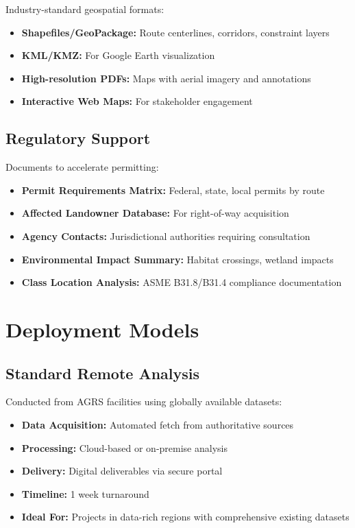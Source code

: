 \documentclass[11pt,letterpaper]{article}
\begin{document}
Industry-standard geospatial formats:

\begin{itemize}[leftmargin=*]
    \item \textbf{Shapefiles/GeoPackage:} Route centerlines, corridors, constraint layers
    \item \textbf{KML/KMZ:} For Google Earth visualization
    \item \textbf{High-resolution PDFs:} Maps with aerial imagery and annotations
    \item \textbf{Interactive Web Maps:} For stakeholder engagement
\end{itemize}

\subsection{Regulatory Support}

Documents to accelerate permitting:

\begin{itemize}[leftmargin=*]
    \item \textbf{Permit Requirements Matrix:} Federal, state, local permits by route
    \item \textbf{Affected Landowner Database:} For right-of-way acquisition
    \item \textbf{Agency Contacts:} Jurisdictional authorities requiring consultation
    \item \textbf{Environmental Impact Summary:} Habitat crossings, wetland impacts
    \item \textbf{Class Location Analysis:} ASME B31.8/B31.4 compliance documentation
\end{itemize}

\newpage

\section{Deployment Models}

\subsection{Standard Remote Analysis}

Conducted from AGRS facilities using globally available datasets:

\begin{itemize}[leftmargin=*]
    \item \textbf{Data Acquisition:} Automated fetch from authoritative sources
    \item \textbf{Processing:} Cloud-based or on-premise analysis
    \item \textbf{Delivery:} Digital deliverables via secure portal
    \item \textbf{Timeline:} 1 week turnaround
    \item \textbf{Ideal For:} Projects in data-rich regions with comprehensive existing datasets
\end{itemize}
\end{document}
